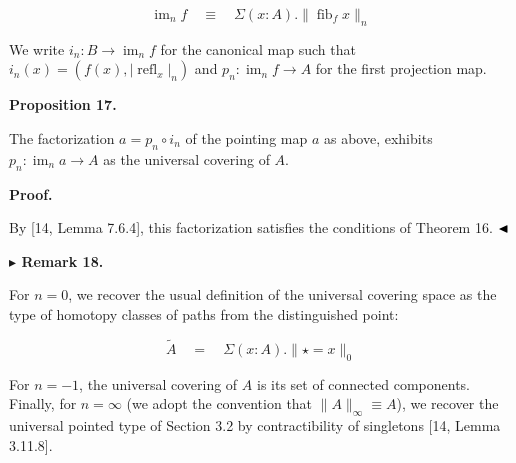 \par  \quad  \[\operatorname{im}_{n}f\quad\equiv\quad\Sigma(x:A).\|\operatorname{fib}_{f}x\|_{n}\]\quad  \quad  
  
We write $i_{n}:B\to\operatorname{im}_{n}f$ for the canonical map such that $i_{n}(x)=(f(x),|\operatorname{refl}_{x}|_{n})$ and $p_{n}:\operatorname{im}_{n}f\to A$ for the first projection map.\par
 
 
 
\par\medskip\noindent\textbf{Proposition 17.}\par
 
 
The factorization $a=p_{n}\circ i_{n}$ of the pointing map $a$ as above, exhibits $p_{n}:\operatorname{im}_{n}a\to A$ as the universal covering of $A$.\par
 
 
 
 
 
\par\medskip\noindent\textbf{Proof.}\par
 
 
By [14, Lemma 7.6.4], this factorization satisfies the conditions of Theorem 16. $\hfill\blacktriangleleft$\par
 
 
 
\par\medskip\noindent\textbf{$\blacktriangleright$ Remark 18.}\par
 
 
For $n=0$, we recover the usual definition of the universal covering space as the type of homotopy classes of paths from the distinguished point:\par
  
\par  \quad  \[\tilde{A}\quad=\quad\Sigma(x:A).\|\star=x\|_{0}\]\quad  \quad  
  
For $n=-1$, the universal covering of $A$ is its set of connected components. Finally, for $n=\infty$ (we adopt the convention that $\|A\|_{\infty}\equiv A$), we recover the universal pointed type of Section 3.2 by contractibility of singletons [14, Lemma 3.11.8].\par
 
